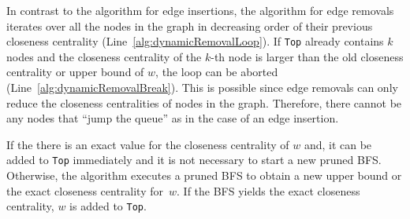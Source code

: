 In contrast to the algorithm for edge insertions, the algorithm for edge removals iterates over all the nodes in the graph in decreasing order of their previous closeness centrality (Line~\ref{alg:dynamicRemovalLoop}). If \texttt{Top} already contains $k$ nodes and the closeness centrality of the $k$-th node is larger than the old closeness centrality or upper bound of $w$, the loop can be aborted (Line~\ref{alg:dynamicRemovalBreak}). This is possible since edge removals can only reduce the closeness centralities of nodes in the graph. Therefore, there cannot be any nodes that ``jump the queue'' as in the case of an edge insertion.

If the there is an exact value for the closeness centrality of $w$ and, it can be added to \texttt{Top} immediately and it is not necessary to start a new pruned BFS. Otherwise, the algorithm executes a pruned BFS to obtain a new upper bound or the exact closeness centrality for~$w$. If the BFS yields the exact closeness centrality, $w$ is added to \texttt{Top}.

